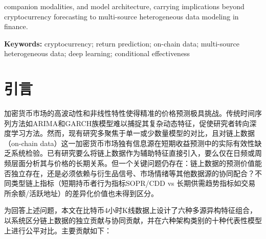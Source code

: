 \documentclass[12pt,a4paper]{ctexart}
\begin{document}
companion modalities, and model architecture, carrying implications beyond cryptocurrency forecasting to multi-source heterogeneous data modeling in finance.

\vspace{1em}
{\bfseries Keywords:} cryptocurrency; return prediction; on-chain data; multi-source heterogeneous data; deep learning; conditional effectiveness

\newpage

\section{引言}

加密货币市场的高波动性和非线性特性使得精准的价格预测极具挑战\cite{urquhart2016,kristoufek2015}。传统时间序列方法如ARIMA和GARCH族模型难以捕捉其复杂动态特征，促使研究者转向深度学习方法。然而，现有研究多聚焦于单一或少数量模型的对比，且对链上数据（on-chain data）这一加密货币市场独有信息源在短期收益预测中的实际有效性缺乏系统检验。已有研究要么将链上数据作为辅助特征直接引入，要么仅在日频或周频层面分析其与价格的长期关系。但一个关键问题仍存在：链上数据的预测价值能否独立存在，还是必须依赖与衍生品信号、市场情绪等其他数据源的协同配合？不同类型链上指标（短期持币者行为指标SOPR/CDD vs 长期供需趋势指标如交易所余额/活跃地址）的差异化价值也未得到区分。

为回答上述问题，本文在比特币4小时K线数据上设计了六种多源异构特征组合，以系统区分链上数据的独立贡献与协同贡献，并在六种架构类别的十种代表性模型上进行公平对比。主要贡献如下：
\end{document}
